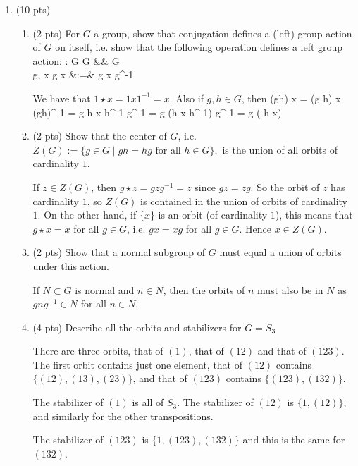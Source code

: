 \documentclass[11pt,reqno]{amsart}
\newcommand{\rr}{\rightarrow}
\begin{document}
\begin{enumerate}
\vspace{0.15in}

\clearpage
\item (10 pts) 

\begin{enumerate}
	\item (2 pts) For $G$ a group, show that conjugation defines a (left) group action of $G$ on itself, i.e. show that the following operation defines a left group action: \be \star: G \times G &\rr& G \\   g, x \mapsto g \star x &:=& g x g^{-1} \ee 

	\begin{solutionbox} We have that $ 1 \star x = 1 x 1^{-1} = x$. Also if $g, h \in G$, then \be (gh) \star x = (g h) x (gh)^{-1} = g h x h^{-1} g^{-1} = g (h x h^{-1}) g^{-1} = g \star ( h \star x) \ee \end{solutionbox}

	\item (2 pts) Show that the center of $G$, i.e. $Z(G):= \{ g \in G \mid gh =hg \mbox{ for all } h \in G \},$ is the union of all orbits of cardinality $1$. 
	
	\begin{solutionbox} If $z \in Z(G)$, then $g \star z = g z g^{-1} = z$ since $gz =zg$. So the orbit of $z$ has cardinality $1$, so $Z(G)$ is contained in the union of orbits of cardinality $1$. On the other hand, if $\{ x \}$ is an orbit (of cardinality $1$), this means that $g \star x =x$ for all $g \in G$, i.e. $gx = xg$ for all $g \in G$. Hence $x \in Z(G)$.
	
	\end{solutionbox}
	
	\item (2 pts) Show that a normal subgroup of $G$ must equal a union of orbits under this action. 
	
	\begin{solutionbox}
		If $N \subset G$ is normal and $n \in N$, then the orbits of $n$ must also be in $N$ as $g n g^{-1} \in N$ for all $n \in N$. 
		
		 	\end{solutionbox}
	
	\item(4 pts) Describe all the orbits and stabilizers for $G=S_3$ 
	
	\begin{solutionbox}
		There are three orbits, that of $(1)$, that of $(12)$ and that of $(123)$. The first orbit contains just one element, that of $(12)$ contains $\{ (12), (13), (23) \}$, and that of $(123)$ contains $\{ (123), (132) \}$. 
		
		The stabilizer of $(1)$ is all of $S_3$. The stabilizer of $(12)$ is $\{ 1, (12) \}$, and similarly for the other transpositions.
		
		The stabilizer of $(123)$ is $\{ 1, (123), (132) \}$ and this is the same for $(132)$.
	\end{solutionbox}
	
	
\end{enumerate}	





\end{enumerate}
\end{document}
